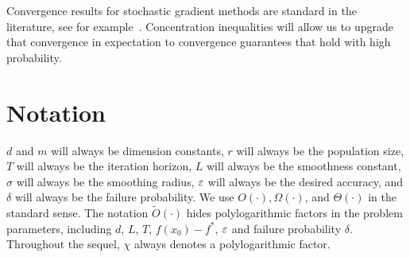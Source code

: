 Convergence results for stochastic gradient methods are standard in the literature, see for example~\cite{ghadimi2013stochastic,nesterov2017random,balasubramanian2018zeroth}. Concentration inequalities will allow us to upgrade that convergence in expectation to convergence guarantees that hold with high probability.

\section{Notation}
$d$ and $m$ will always be dimension constants, $r$ will always be the population size, $T$ will always be the iteration horizon, $L$ will always be the smoothness constant, $\sigma$ will always be the smoothing radius, $\varepsilon$ will always be the desired accuracy, and $\delta$ will always be the failure probability. We use $O(\cdot), \Omega(\cdot)$, and $\Theta(\cdot)$ in the standard sense. The notation $\widetilde O(\cdot)$ hides polylogarithmic factors in the problem parameters, including $d$, $L$, $T$, $f(x_0)-f^*$, $\varepsilon$ and failure probability $\delta$. Throughout the sequel, $\chi$ always denotes a polylogarithmic factor.
